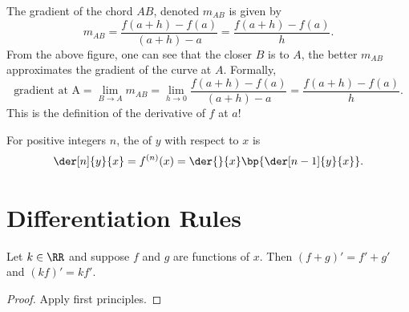 The gradient of the chord $AB$, denoted $m_{AB}$ is given by \[m_{AB} = \frac{f(a + h) - f(a)}{(a + h) - a} = \frac{f(a + h) - f(a)}{h}.\] From the above figure, one can see that the closer $B$ is to $A$, the better $m_{AB}$ approximates the gradient of the curve at $A$. Formally, \[\text{gradient at A} = \lim_{B \to A} m_{AB} = \lim_{h \to 0} \frac{f(a + h) - f(a)}{(a + h) - a} = \frac{f(a + h) - f(a)}{h}.\] This is the definition of the derivative of $f$ at $a$!

\begin{definition}
    For positive integers $n$, the  of $y$ with respect to $x$ is \[\der[n]{y}{x} = f^{(n)}(x) = \der{}{x} \bp{\der[n-1]{y}{x}}.\]
\end{definition}

\section{Differentiation Rules}

\begin{proposition}\label{prop:diff-linear}
    Let $k \in \RR$ and suppose $f$ and $g$ are functions of $x$. Then $(f+g)' = f' + g'$ and $(kf)' = kf'$.
\end{proposition}
\begin{proof}
    Apply first principles.
\end{proof}

